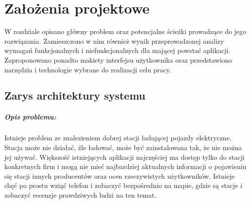 \chapter{Założenia projektowe}
W rozdziale opisano główny problem oraz potencjalne ścieżki prowadzące do jego rozwiązania. Zamieszczono w nim również wynik przeprowadzonej analizy wymagań funkcjonalnych i niefunkcjonalnych dla mającej powstać aplikacji. Zaproponowano ponadto makiety interfejsu użytkownika oraz przedstawiono narzędzia i technologie wybrane do realizacji celu pracy.

\section{Zarys architektury systemu}



\paragraph{Opis problemu:}
Istnieje problem ze znalezieniem dobrej stacji ładującej pojazdy elektryczne.
Stacja może nie działać, źle ładować, może być zainstalowana tak, że nie można jej używać.
Większość istniejących aplikacji najczęściej ma dostęp tylko do stacji konkretnych firm i mogą nie mieć najbardziej aktualnych informacji o pojawieniu się stacji innych producentów oraz ocen rzeczywistych użytkowników.
Istnieje chęć po prostu wziąć telefon i zobaczyć bezpośrednio na mapie, gdzie są stacje i zobaczyć recenzje prawdziwych ludzi na ten temat.

